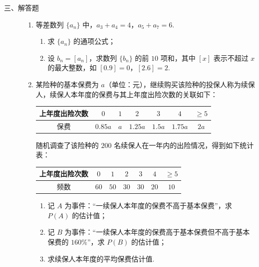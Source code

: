 \begin{description}

    \item[三、解答题]

    \begin{enumerate}[leftmargin=5pt]

      \addtocounter{enumi}{+16}

        \item 等差数列 \(\{a_n\}\) 中，\(a_3+a_4=4\)，\(a_5+a_7=6\).

\begin{enumerate}
\item 求 \(\{a_n\}\) 的通项公式；
\item 设 \(b_n=[a_n]\)，求数列 \(\{b_n\}\) 的前 \(10\) 项和，其中 \([x]\) 表示不超过 \(x\) 的最大整数，如 \([0.9]=0\)，\([2.6]=2\).
\end{enumerate}

        \item 某险种的基本保费为 \(a\)（单位：元），继续购买该险种的投保人称为续保人，续保人本年度的保费与其上年度出险次数的关联如下：

\begin{center}
\begin{tabular}{c|cccccc}
上年度出险次数 & \(0\) & \(1\) & \(2\) & \(3\) & \(4\) & \(\geq 5\)\\
\hline
保费 & \(0.85a\) & \(a\) & \(1.25a\) & \(1.5a\) & \(1.75a\) & \(2a\)
\end{tabular}
\end{center}

随机调查了该险种的 \(200\) 名续保人在一年内的出险情况，得到如下统计表：

\begin{center}
\begin{tabular}{c|cccccc}
上年度出险次数 & \(0\) & \(1\) & \(2\) & \(3\) & \(4\) & \(\geq 5\)\\
\hline
频数 & \(60\) & \(50\) & \(30\) & \(30\) & \(20\) & \(10\)
\end{tabular}
\end{center}

\begin{enumerate}
\item 记 \(A\) 为事件：“一续保人本年度的保费不高于基本保费”，求 \(P(A)\) 的估计值；
\item 记 \(B\) 为事件：“一续保人本年度的保费高于基本保费但不高于基本保费的 \(160\%\)”，求 \(P(B)\) 的估计值；
\item 求续保人本年度的平均保费估计值.
\end{enumerate}


\end{enumerate}
\end{description}
